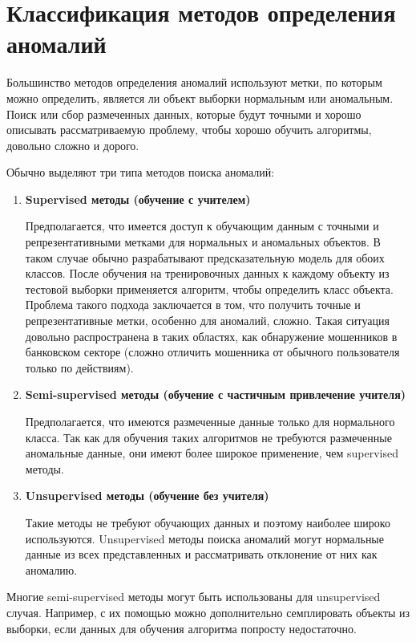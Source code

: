 \clearpage

\section{Классификация методов определения аномалий} \label{sec:ch2/sec2}

Большинство методов определения аномалий используют метки, по которым можно определить, является ли объект выборки нормальным или аномальным. Поиск или сбор размеченных данных, которые будут точными и хорошо описывать рассматриваемую проблему, чтобы хорошо обучить алгоритмы, довольно сложно и дорого.

\noindent Обычно выделяют три типа методов поиска аномалий:

\begin{enumerate}
	\item \textbf{Supervised методы (обучение с учителем)}

Предполагается, что имеется доступ к обучающим данным с точными и репрезентативными метками для нормальных и аномальных объектов. В таком случае обычно разрабатывают предсказательную модель для обоих классов. После обучения на тренировочных данных к каждому объекту из тестовой выборки применяется алгоритм, чтобы определить класс объекта. Проблема такого подхода заключается в том, что получить точные и репрезентативные метки, особенно для аномалий, сложно. Такая ситуация довольно распространена в таких областях, как обнаружение мошенников в банковском секторе (сложно отличить мошенника от обычного пользователя только по действиям).
	
	\item \textbf{Semi-supervised методы (обучение с частичным привлечение учителя)}

Предполагается, что имеются размеченные данные только для нормального класса. Так как для обучения таких алгоритмов не требуются размеченные аномальные данные, они имеют более широкое применение, чем supervised методы.
	\item \textbf{Unsupervised методы (обучение без учителя)}

Такие методы не требуют обучающих данных и поэтому наиболее широко используются. Unsupervised методы поиска аномалий могут нормальные данные из всех представленных и рассматривать отклонение от них как аномалию.
\end{enumerate}
Многие semi-supervised методы могут быть использованы для unsupervised случая. Например, с их помощью можно дополнительно семплировать объекты из выборки, если данных для обучения алгоритма попросту недостаточно.

